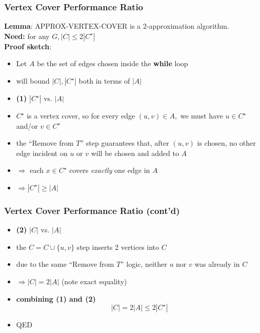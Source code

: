 \documentclass{beamer}
\begin{document}
\begin{frame} \frametitle{Vertex Cover Performance Ratio}
\textbf{Lemma}: APPROX-VERTEX-COVER is a 2-approximation algorithm. \\
\textbf{Need:} for any $G, |C| \leq 2 |C^\star|$ \\
\textbf{Proof sketch}:
\begin{itemize}
  \item Let $A$ be the set of edges chosen inside the \textbf{while} loop
  \item will bound $|C|, |C^\star|$ both in terms of $|A|$
  \item \textbf{(1)} $|C^\star|$ vs. $|A|$
  \item $C^\star$ is a vertex cover, so for every edge $(u, v) \in A,$ we must have
    $u \in C^\star$ and/or $v \in C^\star$
  \item the ``Remove from $T$'' step guarantees that, after $(u, v)$ is chosen,
    no other edge incident on $u$ or $v$ will be chosen and added to $A$
  \item $\Rightarrow$ each $x \in C^\star$ covers \emph{exactly} one edge in $A$
  \item $\Rightarrow |C^\star| \geq |A|$
\end{itemize}
\end{frame}

\begin{frame} \frametitle{Vertex Cover Performance Ratio (cont'd)}
\begin{itemize}
  \item \textbf{(2)} $|C|$ vs. $|A|$
  \item the $C = C \cup \{u, v \}$ step inserts 2 vertices into $C$
  \item  due to the same ``Remove from $T$'' logic, neither $u$ nor $v$ was already
    in $C$
  \item $\Rightarrow |C| = 2|A|$ (note exact equality)
  \item \textbf{combining (1) and (2)}
  \[ |C| = 2|A| \leq 2|C^\star| \]
  \item QED
\end{itemize}
\end{frame}
\end{document}
